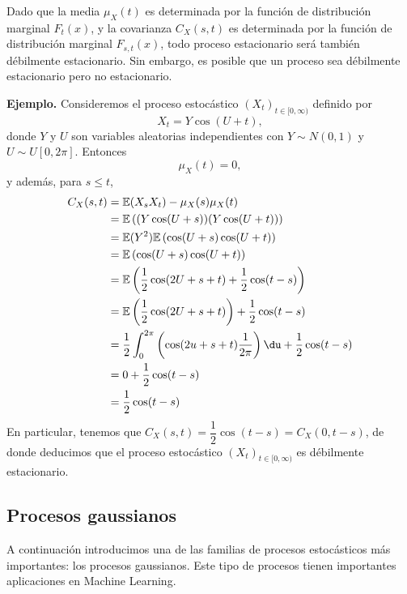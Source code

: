 Dado que la media $\mu_X(t)$ es determinada por la función de distribución marginal $F_t(x)$, y la covarianza  $C_X(s,t)$ es determinada por la función de distribución marginal  $F_{s,t}(x)$, todo proceso estacionario será también débilmente estacionario. Sin embargo, es posible que un proceso sea débilmente estacionario pero no estacionario.

\textbf{Ejemplo.} Consideremos el proceso estocástico $(X_t)_{t\in [0,\infty)}$ definido por \[
X_t=Y\cos(U+t),
\] donde $Y$ y  $U$ son variables aleatorias independientes con  $Y\sim N(0,1)$ y $U\sim U[0,2\pi]$. Entonces \[
\mu_X(t)=0,
\] y además, para $s\le t$, \[
\begin{aligned}
    C_X(s,t)&= \mathbb{E}(X_sX_t)-\mu_X(s)\mu_X(t) \\
    &= \mathbb{E}\left( (Y\cos(U+s))(Y\cos(U+t)) \right)  \\
    &= \mathbb{E}(Y^2)\mathbb{E}\left( \cos(U+s)\cos(U+t) \right)  \\
    &= \mathbb{E}\left( \cos(U+s)\cos(U+t) \right)  \\
    &= \mathbb{E}\left( \frac{1}{2}\cos(2U+s+t)+\frac{1}{2} \cos(t-s)  \right)  \\
    &= \mathbb{E}\left( \frac{1}{2} \cos(2U+s+t) \right)  +\frac{1}{2} \cos(t-s)\\
    &= \dfrac{1}{2} \int_{0}^{2\pi} \left( \cos(2u+s+t)\dfrac{1}{2\pi} \right) \du +\dfrac{1}{2}\cos(t-s) \\
    &= 0+\dfrac{1}{2}\cos(t-s) \\
    &= \dfrac{1}{2}\cos(t-s) \\
\end{aligned}
\] 
En particular, tenemos que $C_X(s,t)=\dfrac{1}{2}\cos(t-s)=C_X(0,t-s)$, de donde deducimos que el proceso estocástico $(X_t)_{t\in [0,\infty)}$ es débilmente estacionario.
\subsection{Procesos gaussianos}
A continuación introducimos una de las familias de procesos estocásticos más importantes: los procesos gaussianos. Este tipo de procesos tienen importantes aplicaciones en Machine Learning.

